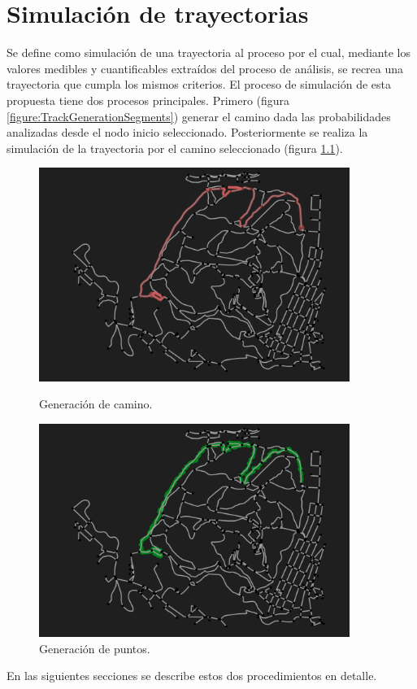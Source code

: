 
\chapter{Simulación de trayectorias}
Se define como simulación de una trayectoria al proceso por el cual, mediante los valores 
medibles y cuantificables extraídos del proceso de análisis, se recrea una trayectoria que cumpla 
los mismos criterios. El proceso de simulación de esta propuesta tiene dos procesos principales.
Primero (figura  \ref{figure:TrackGenerationSegments}) generar el camino dada las probabilidades 
analizadas desde el nodo inicio seleccionado. Posteriormente se realiza la simulación de la trayectoria 
por el camino seleccionado (figura \ref{figure:TrackGenerationPoints}).
\begin{figure}[!htb]
\begin{minipage}{0.48\textwidth}
\centering
\includegraphics[width=0.9\textwidth]{./Imagenes/TrackGenerationSegments.png}
\caption{Generación de camino.}
\label{figure:TrackGenerationSegments}
\end{minipage}\hfill
\begin{minipage}{0.48\textwidth}
\centering
\includegraphics[width=0.9\textwidth]{./Imagenes/TrackGenerationPoints.png}
\caption{Generación de puntos.}
\label{figure:TrackGenerationPoints}
\end{minipage}
\end{figure}
\newpage
En las siguientes secciones se describe estos dos procedimientos en detalle.

